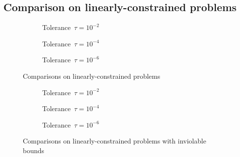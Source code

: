 \subsection{Comparison on linearly-constrained problems}
\label{subsec:comparison-cobyqa-lincoa}

\begin{figure}[ht]
    \centering
    \begin{subfigure}[b]{0.49\textwidth}
        \centering
        \caption{Tolerance~$\tau = 10^{-2}$}
    \end{subfigure}
    \hfill
    \begin{subfigure}[b]{0.49\textwidth}
        \centering
        \caption{Tolerance~$\tau = 10^{-4}$}
    \end{subfigure}
    \begin{subfigure}[b]{0.49\textwidth}
        \centering
        \caption{Tolerance~$\tau = 10^{-6}$}
    \end{subfigure}
    \caption{Comparisons on linearly-constrained problems}
\end{figure}

\begin{figure}[ht]
    \centering
    \begin{subfigure}[b]{0.49\textwidth}
        \centering
        \caption{Tolerance~$\tau = 10^{-2}$}
    \end{subfigure}
    \hfill
    \begin{subfigure}[b]{0.49\textwidth}
        \centering
        \caption{Tolerance~$\tau = 10^{-4}$}
    \end{subfigure}
    \begin{subfigure}[b]{0.49\textwidth}
        \centering
        \caption{Tolerance~$\tau = 10^{-6}$}
    \end{subfigure}
    \caption{Comparisons on linearly-constrained problems with inviolable bounds}
\end{figure}

